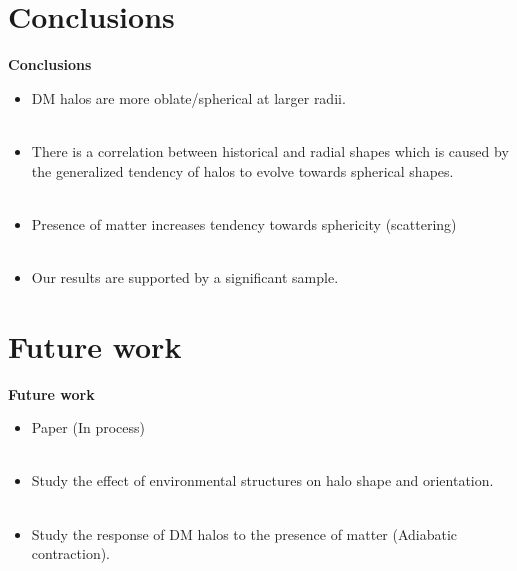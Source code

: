 \documentclass[xcolor=dvipsnames]{beamer}
\begin{document}
\section{Conclusions}
\begin{frame}
\centering
\LARGE
\textbf{Conclusions}
\normalsize
\end{frame}

\begin{frame}

\begin{itemize}

\item DM halos are more oblate/spherical at larger radii.\\~\\

\item There is a correlation between historical and radial shapes which is caused by the generalized tendency of halos to evolve towards spherical shapes.\\~\\

\item Presence of matter increases tendency towards sphericity (scattering) \\~\\

\item Our results are supported by a significant sample.

\end{itemize}

\end{frame}

\section{Future work}
\begin{frame}
\centering
\LARGE
\textbf{Future work}
\normalsize
\end{frame}

\begin{frame}

\begin{itemize}

\item Paper (In process)\\~\\

\item Study the effect of environmental structures on halo shape and orientation.\\~\\

\item Study the response of DM halos to the presence of matter (Adiabatic contraction).\\~\\


\end{itemize}

\end{frame}
\end{document}

